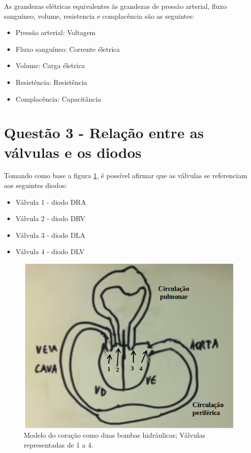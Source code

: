 \documentclass{abntex2}
\begin{document}
As grandezas elétricas equivalentes ãs grandezas de pressão arterial, fluxo sanguíneo, volume, resistencia e complacência são as seguintes:

\begin{itemize}
  \item {Pressão arterial: Voltagem}
  \item {Fluxo sanguíneo: Corrente életrica}
  \item {Volume: Carga életrica}
  \item {Resistência: Resistência}
  \item {Complacência: Capacitância}
\end{itemize}

\section{Questão 3 - Relação entre as válvulas e os diodos}

Tomando como base a figura \ref{fig:coracao}, é possível afirmar que as válvulas se referenciam aos seguintes diodos:
\begin{itemize}
  \item {Válvula 1 - diodo DRA}
  \item {Válvula 2 - diodo DRV}
  \item {Válvula 3 - diodo DLA}
  \item {Válvula 4 - diodo DLV}
\end{itemize}

\begin{figure}[h]
  \centering
  \includegraphics[scale = 0.4]{coracao.png}
  \caption{Modelo do coração como duas bombas hidráulicas; Válvulas representadas de 1 a 4.}
  \label{fig:coracao}
\end{figure}
\pagebreak
\end{document}
